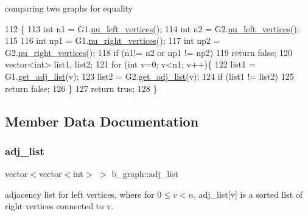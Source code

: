 comparing two graphs for equality 


\begin{DoxyCode}
112 \{
113   \textcolor{keywordtype}{int} n1 = G1.\hyperlink{classb__graph_a5e71d5c97f2501b0b93c17146cf7e68e}{nu\_left\_vertices}();
114   \textcolor{keywordtype}{int} n2 = G2.\hyperlink{classb__graph_a5e71d5c97f2501b0b93c17146cf7e68e}{nu\_left\_vertices}();
115   
116   \textcolor{keywordtype}{int} np1 = G1.\hyperlink{classb__graph_abecfd7d6fbd0d9a554fe0d9aa3241a04}{nu\_right\_vertices}();
117   \textcolor{keywordtype}{int} np2 = G2.\hyperlink{classb__graph_abecfd7d6fbd0d9a554fe0d9aa3241a04}{nu\_right\_vertices}();
118   \textcolor{keywordflow}{if} (n1!= n2 or np1 != np2)
119     \textcolor{keywordflow}{return} \textcolor{keyword}{false};
120   vector<int> list1, list2;
121   \textcolor{keywordflow}{for} (\textcolor{keywordtype}{int} v=0; v<n1; v++)\{
122     list1 = G1.\hyperlink{classb__graph_aa81c7179b9c6cb4986c4b41e84a85799}{get\_adj\_list}(v);
123     list2 = G2.\hyperlink{classb__graph_aa81c7179b9c6cb4986c4b41e84a85799}{get\_adj\_list}(v);
124     \textcolor{keywordflow}{if} (list1 != list2)
125       \textcolor{keywordflow}{return} \textcolor{keyword}{false};
126   \}
127   \textcolor{keywordflow}{return} \textcolor{keyword}{true};
128 \}
\end{DoxyCode}


\subsection{Member Data Documentation}
\mbox{\label{classb__graph_a2a89d2e8f958270952aab2e8769b7342}} 
\subsubsection{\texorpdfstring{adj\+\_\+list}{adj\_list}}
{\footnotesize\ttfamily vector$<$vector$<$int$>$ $>$ b\+\_\+graph\+::adj\+\_\+list\hspace{0.3cm}{\ttfamily [private]}}



adjacency list for left vertices, where for $0 \leq v < n $, adj\+\_\+list\mbox{[}v\mbox{]} is a sorted list of right vertices connected to v. 

\mbox{\label{classb__graph_a311d16462dbb10c47b3a6c80a42139d9}} 
